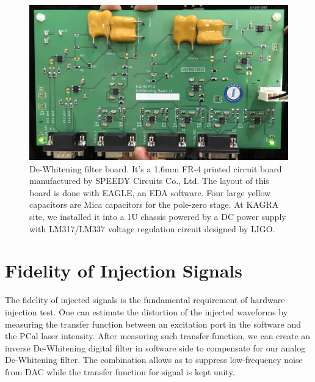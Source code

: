 \begin{figure}[hbt!]
\centering
\includegraphics[width=1\textwidth]{figure/dewPhoto.jpg}
\caption[De-Whitening filter board]{De-Whitening filter board. It's a 1.6mm FR-4 printed circuit board manufactured by SPEEDY Circuits Co., Ltd. The layout of this board is done with EAGLE, an EDA software. Four large yellow capacitors are Mica capacitors for the pole-zero stage. At KAGRA site, we installed it into a 1U chassis powered by a DC power supply with LM317/LM337 voltage regulation circuit designed by LIGO.}
\label{fig:board}
\end{figure}



\pagebreak
\section{Fidelity of Injection Signals}
The fidelity of injected signals is the fundamental requirement of hardware injection test. One can estimate the distortion of the injected waveforms by measuring the transfer function between an excitation port in the software and the PCal laser intensity. After measuring such transfer function, we can create an inverse De-Whitening digital filter in software side to compensate for our analog De-Whitening filter. The combination allows as to suppress low-frequency noise from DAC while the transfer function for signal is kept unity.


